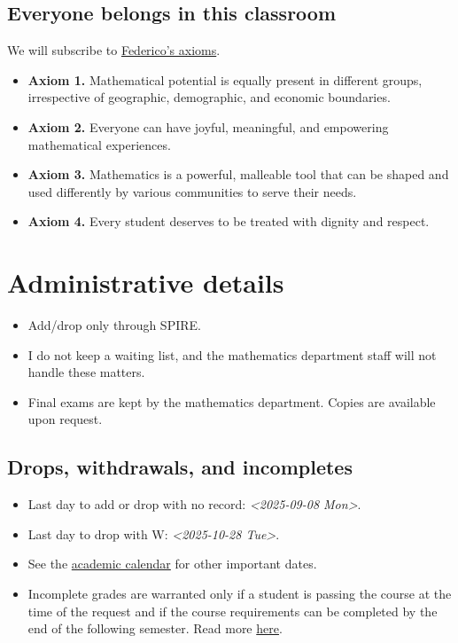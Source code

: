 \documentclass[11pt]{article}
\begin{document}
\subsection*{Everyone belongs in this classroom}
\label{sec:org2b21d3c}
We will subscribe to \href{https://www.ams.org/publications/journals/notices/201610/rnoti-p1164.pdf}{Federico's axioms}.

\begin{itemize}
\item \textbf{Axiom 1.} Mathematical potential is equally present in different groups,
irrespective of geographic, demographic, and economic boundaries.

\item \textbf{Axiom 2.} Everyone can have joyful, meaningful, and empowering mathematical
experiences.

\item \textbf{Axiom 3.} Mathematics is a powerful, malleable tool that can be shaped and
used differently by various communities to serve their needs.

\item \textbf{Axiom 4.} Every student deserves to be treated with dignity and respect.
\end{itemize}

\section*{Administrative details}
\label{sec:orgdebc805}
\begin{itemize}
\item Add/drop only through SPIRE.
\item I do not keep a waiting list, and the mathematics department staff will not
handle these matters.
\item Final exams are kept by the mathematics department. Copies are available upon
request.
\end{itemize}
\subsection*{Drops, withdrawals, and incompletes}
\label{sec:org6fa24c4}
\begin{itemize}
\item Last day to add or drop with no record: \textit{<2025-09-08 Mon>}.
\item Last day to drop with W: \textit{<2025-10-28 Tue>}.
\item See the \href{https://www.umass.edu/registrar/academic-calendar}{academic calendar} for other important dates.
\item Incomplete grades are warranted only if a student is passing the course at the
time of the request and if the course requirements can be completed by the
end of the following semester. Read more \href{https://www.umass.edu/natural-sciences/advising/petitions-and-forms/incomplete-grade-form}{here}.
\end{itemize}
\end{document}
